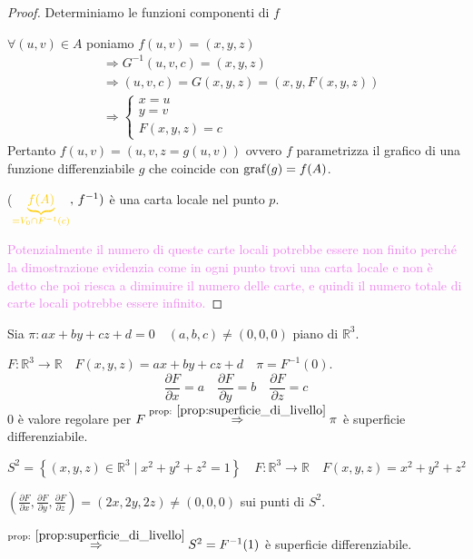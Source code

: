 \begin{proof}
        Determiniamo le funzioni componenti di $f$ 
        
        $\forall (u,v) \in A$ poniamo $f(u,v)=(x,y,z)$
        \[ \begin{aligned} 
            &\Rightarrow G^{-1}(u,v,c)=(x,y,z) \\
            &\Rightarrow (u,v,c)=G(x,y,z)=(x,y,F(x,y,z)) \\
            &\Rightarrow \begin{cases*}
                x=u \\
                y=v \\
                F(x,y,z)=c
            \end{cases*}
        \end{aligned} \]
        Pertanto $f(u,v)=(u,v,z=g(u,v))$ ovvero $f$ parametrizza il grafico di una funzione differenziabile $g$ che coincide con 
        $\operatorname{graf}(g) =f(A)$.

        ($\textcolor{amber}{\underbrace{f(A)}_{= V_0 \cap F^{-1}(c)}}, \, f^{-1})$ è una carta locale nel punto $p$.

        \textcolor{violet}{Potenzialmente il numero di queste carte locali potrebbe essere non finito perché la dimostrazione 
        evidenzia come in ogni punto trovi una carta locale e non è detto che poi riesca a diminuire il numero delle carte, e quindi il numero totale di carte locali potrebbe essere infinito.}
        \end{proof}
        \begin{esempio}
        Sia $\pi: ax+by+cz+d=0 \quad (a,b,c) \neq (0,0,0)$ piano di $\mathbb{R}^3$.

        $F \colon \mathbb{R}^3 \to \mathbb{R} \quad F(x,y,z)=ax+by+cz+d \quad \pi=F^{-1}(0)$.
        \[ \frac{\partial F}{\partial x}=a \quad  \frac{\partial F}{\partial y}=b \quad \frac{\partial F}{\partial z}=c \]
        $0$ è valore regolare per $F \overset{\textcolor{black}{\text{prop: } \ref{prop:superficie_di_livello}}}{\Rightarrow} \pi$ è superficie differenziabile.
        \end{esempio}
        \begin{esempio}
        \mbox{}

        $S^2=\left\{(x,y,z) \in \mathbb{R}^3 \mid x^2+y^2+z^2=1\right\} \quad F \colon \mathbb{R}^3 \to \mathbb{R} \quad F(x,y,z)=x^2+y^2+z^2$

        $\left(\frac{\partial F}{\partial x}, \frac{\partial F}{\partial y}, \frac{\partial F}{\partial z}\right) = (2x, 2y, 2z) \neq (0,0,0)$ sui punti di $S^2$.

        $\overset{\textcolor{black}{\text{prop: } \ref{prop:superficie_di_livello}}}{\Rightarrow} S^2 = F^{-1}(1)$ è superficie differenziabile.
        \end{esempio}
